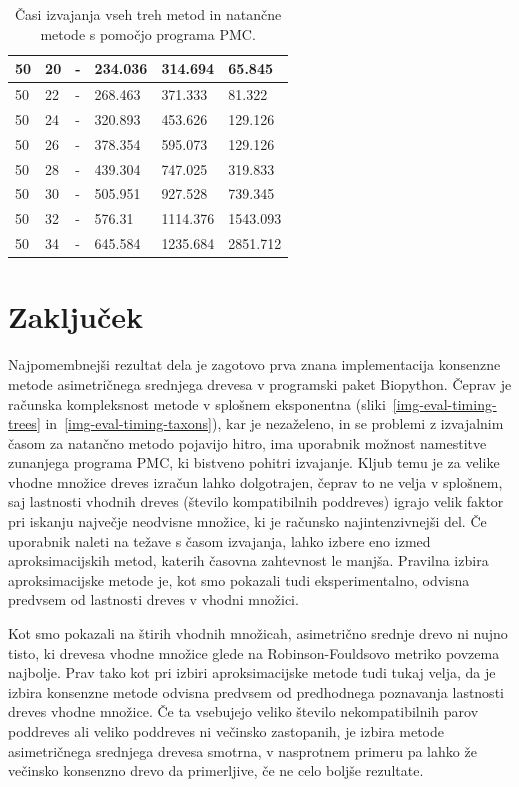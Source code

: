 \documentclass[a4paper, 12pt]{book}
\begin{document}
\begin{table}[h!]
\begin{center}
{\begin{tabular}{ l| l | l | l | l | l }
	50             & 20         & -           & 234.036   & 314.694   & 65.845      \\ \hline
	50             & 22         & -           & 268.463   & 371.333   & 81.322      \\ \hline
	50             & 24         & -           & 320.893   & 453.626   & 129.126     \\ \hline
	50             & 26         & -           & 378.354   & 595.073   & 129.126     \\ \hline
	50             & 28         & -           & 439.304   & 747.025   & 319.833     \\ \hline
	50             & 30         & -           & 505.951   & 927.528   & 739.345     \\ \hline
	50             & 32         & -           & 576.31    & 1114.376  & 1543.093    \\ \hline
	50             & 34         & -           & 645.584   & 1235.684  & 2851.712    \\ \hline
	\end{tabular}
	\label{table-eval-timing}
	\caption{
	 Časi izvajanja vseh treh metod in natančne metode s pomočjo programa PMC.
	 }
	}
	\end{center}		
\end{table}

\chapter{Zaključek}
Najpomembnejši rezultat dela je zagotovo prva znana implementacija konsenzne metode
asimetričnega srednjega drevesa v programski paket Biopython. Čeprav je računska 
kompleksnost metode v splošnem eksponentna (sliki~\ref{img-eval-timing-trees} 
in~\ref{img-eval-timing-taxons}), kar je nezaželeno, in se problemi z
izvajalnim časom za natančno metodo pojavijo hitro, ima uporabnik možnost namestitve 
zunanjega programa PMC, ki bistveno pohitri izvajanje. Kljub temu je za velike vhodne 
množice dreves izračun lahko dolgotrajen, čeprav to ne velja v splošnem,
saj lastnosti vhodnih dreves (število kompatibilnih poddreves) igrajo velik faktor pri
iskanju največje neodvisne množice, ki je računsko najintenzivnejši del. Če 
uporabnik naleti na težave s časom izvajanja, lahko izbere eno izmed 
aproksimacijskih metod, katerih časovna zahtevnost le manjša. Pravilna izbira 
aproksimacijske metode je, kot smo pokazali tudi eksperimentalno, odvisna 
predvsem od lastnosti dreves v vhodni množici. 

Kot smo pokazali na štirih vhodnih množicah, asimetrično srednje drevo ni nujno 
tisto, ki drevesa vhodne množice glede na Robinson-Fouldsovo metriko povzema 
najbolje. Prav tako kot pri izbiri aproksimacijske metode tudi tukaj velja, da 
je izbira konsenzne metode odvisna predvsem od predhodnega poznavanja lastnosti 
dreves vhodne množice. Če ta vsebujejo veliko število nekompatibilnih parov 
poddreves ali veliko poddreves ni večinsko zastopanih, je izbira metode 
asimetričnega srednjega drevesa smotrna, v nasprotnem primeru pa lahko že 
večinsko konsenzno drevo da primerljive, če ne celo boljše rezultate.
\end{document}
